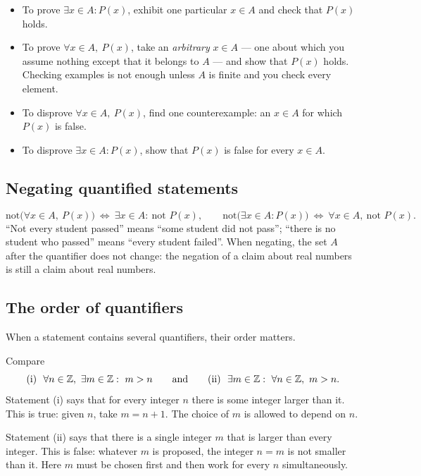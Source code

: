\begin{core}
\begin{itemize}
  \item To prove $\exists x\in A: P(x)$, exhibit one particular $x\in A$ and check that $P(x)$ holds.
  \item To prove $\forall x\in A,\ P(x)$, take an \emph{arbitrary} $x\in A$ --- one about which you assume
  nothing except that it belongs to $A$ --- and show that $P(x)$ holds. Checking examples is not enough
  unless $A$ is finite and you check every element.
  \item To disprove $\forall x\in A,\ P(x)$, find one counterexample: an $x\in A$ for which $P(x)$ is
  false.
  \item To disprove $\exists x\in A: P(x)$, show that $P(x)$ is false for every $x\in A$.
\end{itemize}
\end{core}

\subsection{Negating quantified statements}

\begin{external}
\[
\text{not}\big(\forall x\in A,\ P(x)\big)\ \Leftrightarrow\ \exists x\in A:\ \text{not }P(x),\qquad
\text{not}\big(\exists x\in A: P(x)\big)\ \Leftrightarrow\ \forall x\in A,\ \text{not }P(x).
\]
``Not every student passed'' means ``some student did not pass''; ``there is no student who passed''
means ``every student failed''. When negating, the set $A$ after the quantifier does not change: the
negation of a claim about real numbers is still a claim about real numbers.
\end{external}

\subsection{The order of quantifiers}

When a statement contains several quantifiers, their order matters.

\begin{example}\label{ex:quant-order}
Compare
\[
\text{(i)}\ \ \forall n\in\mathbb{Z},\ \exists m\in\mathbb{Z}:\ m>n
\qquad\text{and}\qquad
\text{(ii)}\ \ \exists m\in\mathbb{Z}:\ \forall n\in\mathbb{Z},\ m>n.
\]
\solution
Statement (i) says that for every integer $n$ there is some integer larger than it. This is true: given
$n$, take $m=n+1$. The choice of $m$ is allowed to depend on $n$.

Statement (ii) says that there is a single integer $m$ that is larger than every integer. This is false:
whatever $m$ is proposed, the integer $n=m$ is not smaller than it. Here $m$ must be chosen first and
then work for every $n$ simultaneously.
\end{example}

